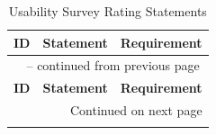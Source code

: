 \documentclass[10pt,titlepage]{article}
\begin{document}
\begin{longtable}{@{}p{}p{}p{}@{}}
\caption{Usability Survey Rating Statements}\label{tab:SurveyStatements}\\

\toprule
\textbf{ID} & \textbf{Statement} & \textbf{Requirement}\\
\midrule
\endfirsthead

\multicolumn{3}{c}{\tablename\ \thetable{} -- continued from previous page}\\
\toprule
\textbf{ID} & \textbf{Statement} & \textbf{Requirement}\\
\midrule
\endhead

\midrule
\multicolumn{3}{r}{Continued on next page}\\
\endfoot


\end{longtable}
\end{document}
